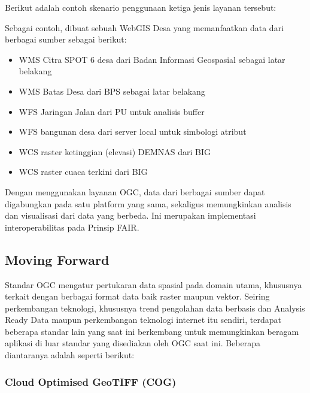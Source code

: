 \documentclass[letterpaper,10pt,english]{sphinxmanual}
\begin{document}
Berikut adalah contoh skenario penggunaan ketiga jenis layanan tersebut:

Sebagai contoh, dibuat sebuah WebGIS Desa yang memanfaatkan data dari berbagai sumber sebagai berikut:
\begin{itemize}
\item {} 
WMS Citra SPOT 6 desa dari Badan Informasi Geospasial sebagai latar belakang

\item {} 
WMS Batas Desa dari BPS sebagai latar belakang

\item {} 
WFS Jaringan Jalan dari PU untuk analisis buffer

\item {} 
WFS bangunan desa dari server local untuk simbologi atribut

\item {} 
WCS raster ketinggian (elevasi) DEMNAS dari BIG

\item {} 
WCS raster cuaca terkini dari BIG

\end{itemize}

Dengan menggunakan layanan OGC, data dari berbagai sumber dapat digabungkan pada satu platform yang sama, sekaligus memungkinkan analisis dan visualisasi dari data yang berbeda. Ini merupakan implementasi interoperabilitas pada Prinsip FAIR.


\subsection{Moving Forward}
\label{\detokenize{sesi3/interoperabilitas:moving-forward}}
Standar OGC mengatur pertukaran data spasial pada domain utama, khususnya terkait dengan berbagai format data baik raster maupun vektor. Seiring perkembangan teknologi, khususnya trend pengolahan data berbasis  dan Analysis Ready Data maupun perkembangan teknologi internet itu sendiri, terdapat beberapa standar lain yang saat ini berkembang untuk memungkinkan beragam aplikasi di luar standar yang disediakan oleh OGC saat ini. Beberapa diantaranya adalah seperti berikut:


\subsubsection{Cloud Optimised GeoTIFF (COG)}
\label{\detokenize{sesi3/interoperabilitas:cloud-optimised-geotiff-cog}}
\end{document}
